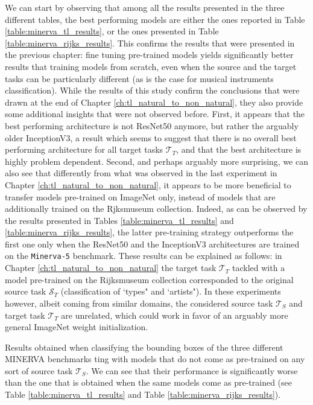 We can start by observing that among all the results presented in the three different tables, the best performing models are either the ones reported in Table \ref{table:minerva_tl_results}, or the ones presented in Table \ref{table:minerva_rijks_results}. This confirms the results that were presented in the previous chapter: fine tuning pre-trained models yields significantly better results that training models from scratch, even when the source and the target tasks can be particularly different (as is the case for musical instruments classification). While the results of this study confirm the conclusions that were drawn at the end of Chapter \ref{ch:tl_natural_to_non_natural}, they also provide some additional insights that were not observed before. First, it appears that the best performing architecture is not ResNet50 anymore, but rather the arguably older InceptionV3, a result which seems to suggest that there is no overall best performing architecture for all target tasks $\mathcal{T}_T$, and that the best architecture is highly problem dependent. Second, and perhaps arguably more surprising, we can also see that differently from what was observed in the last experiment in Chapter \ref{ch:tl_natural_to_non_natural}, it appears to be more beneficial to transfer models pre-trained on ImageNet only, instead of models that are additionally trained on the Rjksmuseum collection. Indeed, as can be observed by the results presented in Tables \ref{table:minerva_tl_results} and \ref{table:minerva_rijks_results}, the latter pre-training strategy outperforms the first one only when the ResNet50 and the InceptionV3 architectures are trained on the \texttt{Minerva-5} benchmark. These results can be explained as follows: in Chapter \ref{ch:tl_natural_to_non_natural} the target task $\mathcal{T}_T$ tackled with a model pre-trained on the Rijksmuseum collection corresponded to the original source task $\mathcal{S}_T$ (classification of `types" and `artists"). In these experiments however, albeit coming from similar domains, the considered source task $\mathcal{T}_S$ and target task $\mathcal{T}_T$ are unrelated, which could work in favor of an arguably more general ImageNet weight initialization.


\begin{table}
	\caption{Results obtained when classifying the bounding boxes of the three different MINERVA benchmarks ting with models that do not come as pre-trained on any sort of source task $\mathcal{T}_S$. We can see that their performance is significantly worse than the one that is obtained when the same models come as pre-trained (see Table \ref{table:minerva_tl_results} and Table \ref{table:minerva_rijks_results}).}
\resizebox{\columnwidth}{!}{%
}
\label{table:minerva_no_tl_results}
\end{table}



